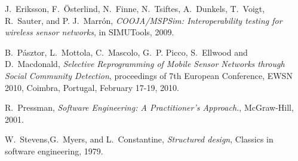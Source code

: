 \begin{thebibliography}{1}

J.~Eriksson, F.~Österlind, N.~Finne, N.~Tsiftes, A.~Dunkels, T.~Voigt, R.~Sauter, and P. J.~Marrón, \emph{COOJA/MSPSim: Interoperability testing for wireless sensor networks}, in SIMUTools, 2009.

B.~Pásztor, L.~Mottola, C.~Mascolo, G.~P. Picco, S.~Ellwood and D.~Macdonald, \emph{Selective Reprogramming of Mobile Sensor Networks through Social Community Detection},
proceedings of 7th European Conference, EWSN 2010, Coimbra, Portugal, February 17-19, 2010.

R.~Pressman, \emph{Software Engineering: A Practitioner’s Approach.},
McGraw-Hill, 2001.

W.~Stevens,G.~Myers, and L.~Constantine, \emph{Structured design}, Classics in software engineering, 1979.

\end{thebibliography}